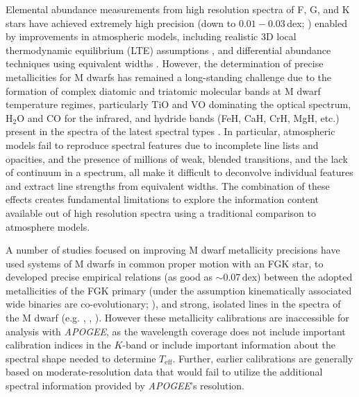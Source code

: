 \documentclass[modern]{aastex62}
\newcommand{\apogee}{\textsl{APOGEE}}
\newcommand{\teff}{T_{\mathrm{eff}}}
\begin{document}
Elemental abundance measurements from high resolution spectra of F, G, and K stars have achieved extremely high precision (down to $0.01-0.03$\,dex; \citealt{Nissen2018}) enabled by improvements in atmospheric models, including realistic 3D local thermodynamic equilibrium (LTE) assumptions \citep{Asplund2005}, and differential abundance techniques using equivalent widths \citep{Bedell2014}. However, the determination of precise metallicities for M dwarfs has remained a long-standing challenge due to the formation of complex diatomic and triatomic molecular bands at M dwarf temperature regimes, particularly TiO and VO dominating the optical spectrum, H$_2$O and CO for the infrared, and hydride bands (FeH, CaH, CrH, MgH, etc.) present in the spectra of the latest spectral types \citep{Allard1997}.
In particular, atmospheric models fail to reproduce spectral features \citep[e.g.,][]{Mann:2013c} due to incomplete line lists and opacities, and the presence of millions of weak, blended transitions, and the lack of continuum in a spectrum, all make it difficult to deconvolve individual features and extract line strengths from equivalent widths. The combination of these effects creates fundamental limitations to explore the information content available out of high resolution spectra using a traditional comparison to atmosphere models.

A number of studies focused on improving M dwarf metallicity precisions have used systems of M dwarfs in common proper motion with an FGK star, to developed precise empirical relations (as good as $\sim$0.07\,dex) between the adopted metallicities of the FGK primary (under the assumption kinematically associated wide binaries are co-evolutionary; \citealt{Bonfils:2005}), and strong, isolated lines in the spectra of the M dwarf (e.g. \citealt{Terrien:2012}, \citealt{Rojas-Ayala:2012}, \citealt{Newton:2014}). However these metallicity calibrations are inaccessible for analysis with \apogee, as the wavelength coverage does not include important calibration indices in the $K$-band or include important information about the spectral shape needed to determine $\teff$. Further, earlier calibrations are generally based on moderate-resolution data \citep[with some exceptions,][]{Neves:2014, Lindgren:2016} that would fail to utilize the additional spectral information provided by \apogee's resolution.

\end{document}
